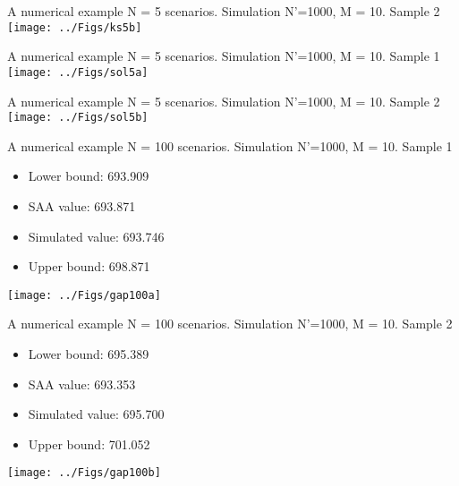 \begin{frame}{A numerical example}
{N = 5 scenarios. Simulation N'=1000, M = 10. Sample 2}
\centering \texttt{[image: ../Figs/ks5b]} 
\end{frame}



\begin{frame}{A numerical example}
{N = 5 scenarios. Simulation N'=1000, M = 10. Sample 1}
\centering \texttt{[image: ../Figs/sol5a]} 
\end{frame}

\begin{frame}{A numerical example}
{N = 5 scenarios. Simulation N'=1000, M = 10. Sample 2}
\centering \texttt{[image: ../Figs/sol5b]} 
\end{frame}

\begin{frame}{A numerical example}
{N = 100 scenarios. Simulation N'=1000, M = 10. Sample 1}

\begin{itemize}
\item Lower bound: 693.909  

\item SAA value:  693.871 

\item Simulated value:  693.746

\item Upper bound:  698.871 
\end{itemize}

\centering \texttt{[image: ../Figs/gap100a]}  
\end{frame}

\begin{frame}{A numerical example}
{N = 100 scenarios. Simulation N'=1000, M = 10. Sample 2}

\begin{itemize}
\item Lower bound: 695.389  

\item SAA value:  693.353 

\item Simulated value:  695.700  

\item Upper bound:  701.052 
\end{itemize}

\centering \texttt{[image: ../Figs/gap100b]}  
\end{frame}

